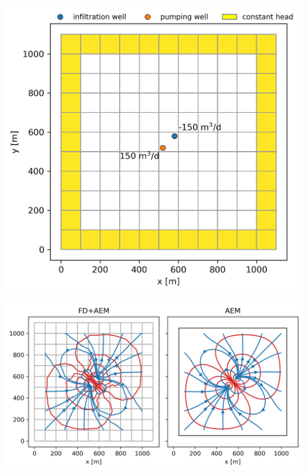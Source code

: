 \documentclass[17pt, a0paper, portrait, margin=0mm, innermargin=5mm, blockverticalspace=7mm, colspace=6.5mm, subcolspace=6.5mm]{tikzposter}
\begin{document}
\begin{columns}
{\begin{multicols}{3}
            \begin{tikzfigure}
                \includegraphics[width=0.75\linewidth]{figures/b05_fd_model_boundaries.png}
            \end{tikzfigure}

            \begin{tikzfigure}
                \includegraphics[width=\linewidth]{figures/b05_flow_net.png}
            \end{tikzfigure}
            
        \end{multicols}


}
\end{columns}
\end{document}
